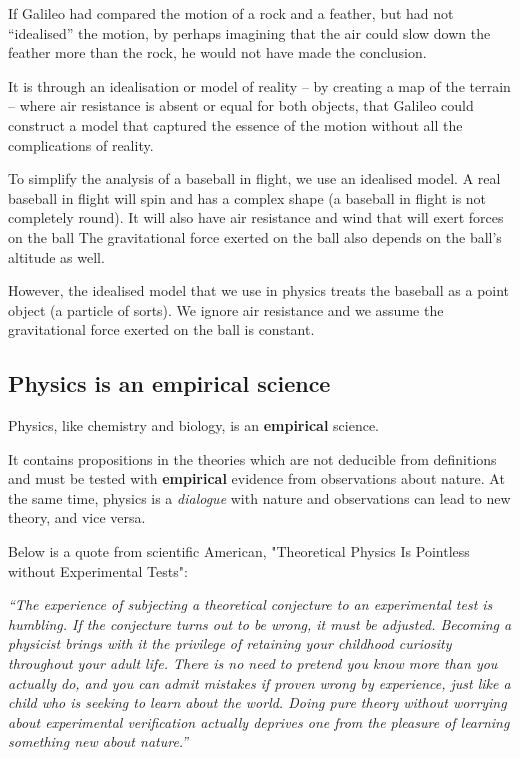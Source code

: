 \documentclass[11pt]{article}
\begin{document}
If Galileo had compared the motion of a rock and a feather, but had not “idealised” the motion, by perhaps imagining that the air could slow down the feather more than the rock, he would not have made the conclusion.


It is through an idealisation or model of reality – by creating a map of the terrain – where air resistance is absent or equal for both objects, that Galileo could construct a model that captured the essence of the motion without all the complications of reality.


To simplify the analysis of a baseball in flight, we use an idealised model. A real baseball in flight will spin and has a complex shape (a baseball in flight is not completely round). It will also have air resistance and wind that will exert forces on the ball The gravitational force exerted on the ball also depends on the ball's altitude as well.


However, the idealised model that we use in physics treats the baseball as a point object (a particle of sorts). We ignore air resistance and we assume the gravitational force exerted on the ball is constant.

\newpage
\subsection{Physics is an empirical science}
\label{sec:orgf314cb2}
Physics, like chemistry and biology, is an \textbf{empirical} science.


It contains propositions in the theories which are not deducible from definitions and must be tested with \textbf{empirical} evidence from observations about nature. At the same time, physics is a \emph{dialogue} with nature and observations can lead to new theory, and vice versa.

Below is a quote from scientific American, "Theoretical Physics Is Pointless without Experimental Tests":


\emph{“The experience of subjecting a theoretical conjecture to an experimental test is humbling. If the conjecture turns out to be wrong, it must be adjusted. Becoming a physicist brings with it the privilege of retaining your childhood curiosity throughout your adult life. There is no need to pretend you know more than you actually do, and you can admit mistakes if proven wrong by experience, just like a child who is seeking to learn about the world. Doing pure theory without worrying about experimental verification actually deprives one from the pleasure of learning something new about nature.”}
\end{document}
